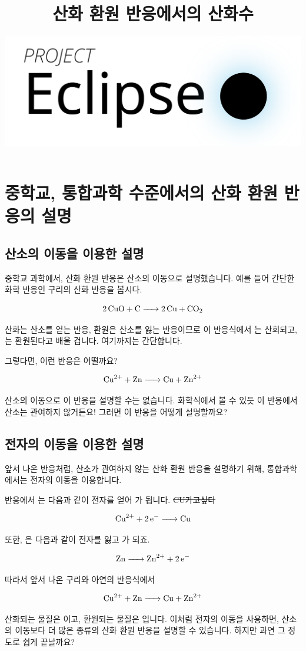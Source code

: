 \documentclass{article}
\title{산화 환원 반응에서의 산화수}
\author{
    \includegraphics[scale=0.25]{logo}
}
\date{}
\begin{document}
\maketitle

\section{중학교, 통합과학 수준에서의 산화 환원 반응의 설명}

\subsection{산소의 이동을 이용한 설명}
중학교 과학에서, 산화 환원 반응은 산소의 이동으로 설명했습니다. 예를 들어 간단한 화학 반응인 구리의 산화 반응을 봅시다.

\[
    \ce{2CuO + C -> 2Cu + CO_2}
\]

산화는 산소를 얻는 반응, 환원은 산소를 잃는 반응이므로 이 반응식에서 는 산회되고, 는 환원된다고 배울 겁니다. 여기까지는 간단합니다. \newline

그렇다면, 이런 반응은 어떨까요?

\[
    \ce{Cu^{2+} + Zn -> Cu + Zn^{2+}}
\]

산소의 이동으로 이 반응을 설명할 수는 없습니다. 화학식에서 볼 수 있듯 이 반응에서 산소는 관여하지 않거든요! 그러면 이 반응을 어떻게 설명할까요?

\subsection{전자의 이동을 이용한 설명}
앞서 나온 반응처럼, 산소가 관여하지 않는 산화 환원 반응을 설명하기 위해, 통합과학에서는 전자의 이동을 이용합니다. \newline

반응에서 는 다음과 같이 전자를 얻어 가 됩니다. \sout{CU가고싶다}

\[
    \ce{Cu^{2+} + 2e^- -> Cu}
\]

또한, 은 다음과 같이 전자를 잃고 가 되죠.

\[
    \ce{Zn -> Zn^{2+} + 2e^-}
\]

따라서 앞서 나온 구리와 아연의 반응식에서

\[
    \ce{Cu^{2+} + Zn -> Cu + Zn^{2+}}
\]

산화되는 물질은 이고, 환원되는 물질은 입니다. 이처럼 전자의 이동을 사용하면, 산소의 이동보다 더 많은 종류의 산화 환원 반응을 설명할 수 있습니다. 하지만 과연 그 정도로 쉽게 끝날까요?
\end{document}
